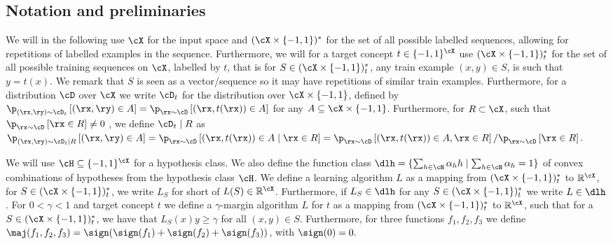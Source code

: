 \subsection{Notation and preliminaries}\label{sec:notationandpreliminaries}


We will in the following use $ \cX $  for the input space and $ (\cX\times \{ -1,1 \})^{*}  $ for the set of all possible labelled sequences, allowing for repetitions of labelled examples in the sequence. Furthermore, we will for a target concept $ t \in \{  -1,1\}^{\cX}  $  use $ (\cX\times\{  -1,1\})_{t}^{*} $ for the set of all possible training sequences on $ \cX $, labelled by $ t $, that is for $ S\in (\cX\times\{  -1,1\})_{t}^{*} $, any train example $ (x,y)\in S $, is such that $ y=t(x).$ We remark that $ S $ is seen as a vector/sequence so it may have repetitions of similar train examples. Furthermore, for a distribution $ \cD $ over $ \cX $ we write $ \cD_{t} $ for the distribution over $ \cX\times\{  -1,1\}  $, defined by $ \p_{(\rx,\ry)\sim\cD_{t}}\left[(\rx,\ry)\in A\right]=\p_{\rx\sim \cD}\left[(\rx,t(\rx))\in A\right] $ for any  $ A\subseteq \cX\times\{  -1,1\}$. Furthermore, for $ R\subset \cX $, such that $ \p_{\rx\sim\cD}\left[\rx\in R\right]\not=0 $ , we define $ \cD_{t}\mid R $ as $ \p_{(\rx,\ry)\sim\cD_{t}\mid R}\left[(\rx,\ry)\in A\right]=\p_{\rx\sim \cD}\left[(\rx,t(\rx))\in A\mid \rx\in R\right]=\p_{\rx\sim \cD}\left[(\rx,t(\rx))\in A, \rx\in R\right]/\p_{\rx\sim \cD}\left[\rx\in R\right].$

We will use $ \cH \subseteq \{  -1,1\}^{\cX} $ for a hypothesis class. We also define the function class $ \dlh =\{\sum_{h\in \cH}\alpha_{h} h\mid \sum_{h\in\cH} \alpha_{h}=1  \}$ of convex combinations of hypotheses from the hypothesis class $ \cH $.  We define a learning algorithm $ L $  as a mapping from $ (\cX\times\{  -1,1\})_{t}^{*} $ to $ \mathbb{R}^{\cX} $, for $ S\in (\cX\times\{  -1,1\})_{t}^{*} $, we write $ L_{S} $ for short of $ L(S)\in\mathbb{R}^{\cX} $. Furthermore, if $ L_{S} \in \dlh$ for any $ S\in (\cX\times\{  -1,1\})_{t}^{*} $ we write $ L\in \dlh $ . For $ 0<\gamma<1 $ and target concept $ t $  we define a $ \gamma $-margin algorithm $ L $ for $ t $   as a mapping from $ (\cX\times\{  -1,1\})_{t}^{*} $ to $ \mathbb{R}^{\cX} $, such that for a $ S\in (\cX\times\{  -1,1\})_{t}^{*} $, we have that $ L_{S}(x)y\geq \gamma $ for all $ (x,y)\in S.$ Furthermore, for three functions $ f_{1},f_{2},f_{3} $ we define $ \maj(f_{1},f_{2},f_{3})=\sign(\sign(f_{1})+\sign(f_{2})+\sign(f_{3})) $, with $ \sign(0)=0.$   

